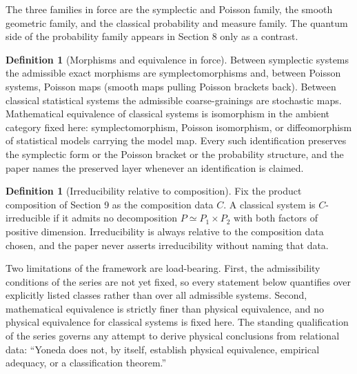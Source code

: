 \documentclass[11pt,letterpaper]{article}
\theoremstyle{definition}
\newtheorem{definition}[theorem]{Definition}
\theoremstyle{remark}
\begin{document}
The three families in force are the symplectic and Poisson family, the smooth geometric family, and the classical probability and measure family. The quantum side of the probability family appears in Section 8 only as a contrast.

\begin{definition}[Morphisms and equivalence in force]
\label{def:morphisms}
Between symplectic systems the admissible exact morphisms are symplectomorphisms and, between Poisson systems, Poisson maps (smooth maps pulling Poisson brackets back). Between classical statistical systems the admissible coarse-grainings are stochastic maps. Mathematical equivalence of classical systems is isomorphism in the ambient category fixed here: symplectomorphism, Poisson isomorphism, or diffeomorphism of statistical models carrying the model map. Every such identification preserves the symplectic form or the Poisson bracket or the probability structure, and the paper names the preserved layer whenever an identification is claimed.
\end{definition}

\begin{definition}[Irreducibility relative to composition]
\label{def:irreducible}
Fix the product composition of Section 9 as the composition data $C$. A classical system is $C$-irreducible if it admits no decomposition $P \simeq P_1 \times P_2$ with both factors of positive dimension. Irreducibility is always relative to the composition data chosen, and the paper never asserts irreducibility without naming that data.
\end{definition}

Two limitations of the framework are load-bearing. First, the admissibility conditions of the series are not yet fixed, so every statement below quantifies over explicitly listed classes rather than over all admissible systems. Second, mathematical equivalence is strictly finer than physical equivalence, and no physical equivalence for classical systems is fixed here. The standing qualification of the series governs any attempt to derive physical conclusions from relational data: ``Yoneda does not, by itself, establish physical equivalence, empirical adequacy, or a classification theorem.''
\end{document}
